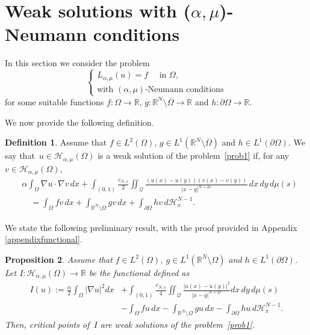 \documentclass[12pt,a4paper,intlimits,sumlimits]{amsart}
\def \R {\mathbb{R}}
\def \Q {\mathcal Q}
\theoremstyle{definition}
\newtheorem{definition}{Definition}[section]
\theoremstyle{plain}
\newtheorem{proposition}[definition]{Proposition}
\numberwithin{equation}{section}
\begin{document}
\section{Weak solutions with ($\alpha,\mu$)-Neumann conditions}\label{PSJLDSLD-2e0dfjev}

In this section we consider the problem
\begin{equation}\label{prob1}
\begin{cases}
L_{\alpha, \mu}(u) = f \quad\mbox{ in } \Omega,\\
\mbox{with }(\alpha,\mu)\mbox{-Neumann conditions}
\end{cases}
\end{equation}
for some suitable functions $f:\Omega\to\R$, $g:\R^N\setminus\overline{\Omega}\to\R$ and $h:\partial\Omega\to\R$.

We now provide the following definition.
\begin{definition}\label{weakdefn}
Assume that $f\in L^2(\Omega)$, $g\in L^1(\R^N\setminus\overline\Omega)$
and $h\in L^1(\partial\Omega)$. We say that~$u\in \mathcal{H}_{\alpha, \mu}(\Omega)$ is a weak solution of the problem~\eqref{prob1}
if, for any~$v\in  \mathcal{H}_{\alpha, \mu}(\Omega)$,
\begin{equation}\label{weaksolution}
\begin{split}
&\alpha \int_\Omega \nabla u\cdot\nabla v\, dx +\int_{(0, 1)} \frac{c_{N, s}}{2} \iint_{\Q} \frac{(u(x)-u(y))(v(x)-v(y))}{|x-y|^{N+2s}} \,dx\,dy\, d\mu(s)\\
&\quad = \int_\Omega fv \, dx +\int_{\R^N\setminus\Omega} gv \, dx +\int_{\partial\Omega} hv \, d\mathscr{H}_x^{N-1}.
\end{split}
\end{equation}
\end{definition}

We state the following preliminary result, with the proof provided in Appendix \ref{appendixfunctional}.
\begin{proposition}\label{propfunctional}
Assume that $f\in L^2(\Omega)$, $g\in L^1(\R^N\setminus\Omega)$
and $h\in L^1(\partial\Omega)$. Let $I:\mathcal{H}_{\alpha, \mu}(\Omega)\to\R$ be the functional defined as
\[
\begin{split}
I(u):= \frac{\alpha}{2}\int_\Omega |\nabla u|^2 dx &+\int_{(0, 1)} \frac{c_{N, s}}{4} \iint_{\Q} \frac{|u(x)-u(y)|^2}{|x-y|^{N+2s}} dx\,dy\, d\mu(s)\\
&- \int_\Omega fu \, dx -\int_{\R^N\setminus\Omega} gu \, dx -\int_{\partial\Omega} hu \, d\mathscr{H}_x^{N-1}.
\end{split}
\]
Then, critical points of~$I$ are weak solutions of the problem~\eqref{prob1}.
\end{proposition}
\end{document}
